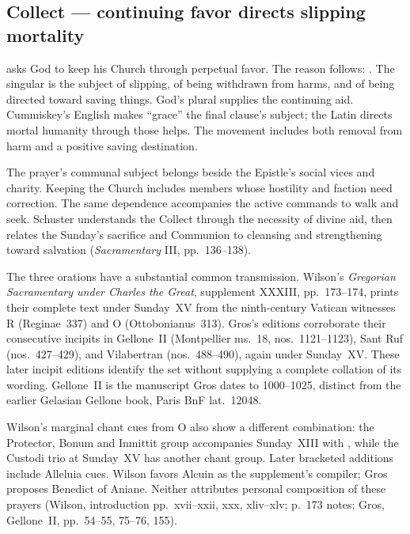 \subsection*{Collect --- continuing favor directs slipping mortality\enspace{}}\label{collect-treatment}

 asks God to keep his Church through perpetual favor. The
reason follows: . The singular
 is the subject of slipping, of being withdrawn from
harms, and of being directed toward saving things. God's plural
 supplies the continuing aid. Cummiskey's English makes
``grace'' the final clause's subject; the Latin directs mortal humanity
through those helps. The movement includes both removal from harm and a
positive saving destination.

The prayer's communal subject belongs beside the Epistle's social vices and
charity. Keeping the Church includes members whose hostility and faction
need correction. The same dependence accompanies the active commands to walk
and seek. Schuster understands the Collect through the necessity of divine
aid, then relates the Sunday's sacrifice and Communion to cleansing and
strengthening toward salvation (\emph{Sacramentary} III, pp.~136--138).

The three orations have a substantial common transmission. Wilson's
\emph{Gregorian Sacramentary under Charles the Great}, supplement XXXIII,
pp.~173--174, prints their complete text under Sunday~XV from the
ninth-century Vatican witnesses R (Reginae~337) and O (Ottobonianus~313).
Gros's editions corroborate their consecutive incipits in Gellone~II
(Montpellier ms.~18, nos.~1121--1123), Sant Ruf (nos.~427--429), and
Vilabertran (nos.~488--490), again under Sunday~XV. These later incipit
editions identify the set without supplying a complete collation of its
wording. Gellone~II is the manuscript Gros dates to 1000--1025, distinct from
the earlier Gelasian Gellone book, Paris BnF lat.~12048.

Wilson's marginal chant cues from O also show a different combination: the
Protector, Bonum and Inmittit group accompanies Sunday~XIII with
, while the Custodi trio at Sunday~XV has another chant
group. Later bracketed additions include Alleluia cues. Wilson favors Alcuin
as the supplement's compiler; Gros proposes Benedict of Aniane. Neither
attributes personal composition of these prayers (Wilson, introduction
pp.~xvii--xxii, xxx, xliv--xlv; p.~173 notes; Gros, Gellone~II,
pp.~54--55, 75--76, 155).


